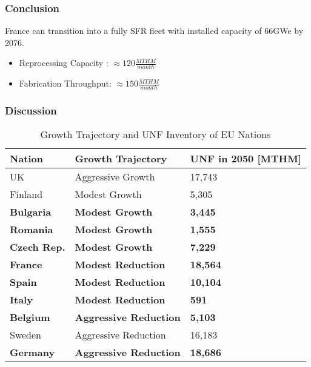 \begin{frame}
	\frametitle{Conclusion}
	France can transition into
	a fully SFR fleet with installed capacity of 66GWe by 2076.
	\begin{itemize}
		\item Reprocessing Capacity : $\approx 120 \frac{MTHM}{month}$
		\item Fabrication Throughput: $\approx 150 \frac{MTHM}{month}$
	\end{itemize}
\end{frame}

\begin{frame}
    \frametitle{Discussion}
    \begin{table}[h]
\centering
    \begin{adjustbox}{max totalsize={1.1\textwidth}{.8\textheight}, center}
                \begin{tabularx}{\textwidth}{lbb}
                    \hline 
                    
                    \textbf{Nation} & \textbf{Growth Trajectory} & \small{\textbf{UNF in 2050 [MTHM] }}\\
                    \hline
                    UK & Aggressive Growth & 17,743\\
                    \hline
                    Finland & Modest Growth & 5,305\\
                    \hline
                    \textbf{Bulgaria} & \textbf{Modest Growth} & \textbf{3,445 }\\
                    \hline
                    \textbf{Romania} & \textbf{Modest Growth} &\textbf{1,555 }\\
                    \hline
                    \textbf{Czech Rep.} & \textbf{Modest Growth} & \textbf{7,229}\\
                    \hline
                    \textbf{France} & \textbf{Modest Reduction} & \textbf{18,564}\\
                    \hline
                    \textbf{Spain} & \textbf{Modest Reduction} &  \textbf{10,104 }\\
                    \hline
                    \textbf{Italy} & \textbf{Modest Reduction} & \textbf{591}\\
                    \hline
                    \textbf{Belgium} & \textbf{Aggressive Reduction} & \textbf{5,103}\\
                    \hline
                    Sweden & Aggressive Reduction & 16,183\\
                    \hline
                    \textbf{Germany} & \textbf{Aggressive Reduction} & \textbf{18,686}\\
                    \hline
                    
                \end{tabularx}
    \end{adjustbox}
    \caption {Growth Trajectory and UNF Inventory of \gls{EU} Nations}
    \label{tab:which_count}
\end{table}
\end{frame}


